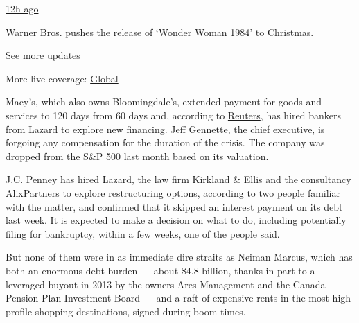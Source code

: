 \href{https://www.nytimes3xbfgragh.onion/live/2020/09/11/business/stock-market-today-coronavirus?action=click\&pgtype=Article\&state=default\&region=MAIN_CONTENT_1\&context=storylines_live_updates\#warner-bros-pushes-the-release-of-wonder-woman-1984-to-christmas}{12h
ago}

\href{https://www.nytimes3xbfgragh.onion/live/2020/09/11/business/stock-market-today-coronavirus?action=click\&pgtype=Article\&state=default\&region=MAIN_CONTENT_1\&context=storylines_live_updates\#warner-bros-pushes-the-release-of-wonder-woman-1984-to-christmas}{Warner
Bros. pushes the release of `Wonder Woman 1984' to Christmas.}

\href{https://www.nytimes3xbfgragh.onion/live/2020/09/11/business/stock-market-today-coronavirus?action=click\&pgtype=Article\&state=default\&region=MAIN_CONTENT_1\&context=storylines_live_updates}{See
more updates}

More live coverage:
\href{https://www.nytimes3xbfgragh.onion/2020/09/11/world/covid-19-coronavirus.html?action=click\&pgtype=Article\&state=default\&region=MAIN_CONTENT_1\&context=storylines_live_updates}{Global}

Macy's, which also owns Bloomingdale's, extended payment for goods and
services to 120 days from 60 days and, according to
\href{https://www.reuters.com/article/us-macy-s-lazard-exclusive/exclusive-macys-taps-lazard-to-bolster-finances-as-coronavirus-saps-sales-sources-idUSKCN21T0V7?campaign_id=4\&emc=edit_dk_20200413\&instance_id=17600\&nl=dealbook\&regi_id=85191350\&segment_id=24954\&te=1\&user_id=81e072bc836b948b7626c901a9b9bda3}{Reuters},
has hired bankers from Lazard to explore new financing. Jeff Gennette,
the chief executive, is forgoing any compensation for the duration of
the crisis. The company was dropped from the S\&P 500 last month based
on its valuation.

J.C. Penney has hired Lazard, the law firm Kirkland \& Ellis and the
consultancy AlixPartners to explore restructuring options, according to
two people familiar with the matter, and confirmed that it skipped an
interest payment on its debt last week. It is expected to make a
decision on what to do, including potentially filing for bankruptcy,
within a few weeks, one of the people said.

But none of them were in as immediate dire straits as Neiman Marcus,
which has both an enormous debt burden --- about \$4.8 billion, thanks
in part to a leveraged buyout in 2013 by the owners Ares Management and
the Canada Pension Plan Investment Board --- and a raft of expensive
rents in the most high-profile shopping destinations, signed during boom
times.


